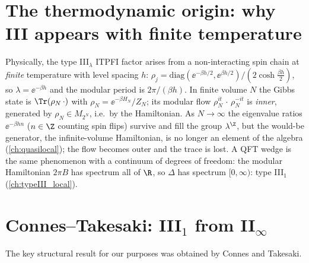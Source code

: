 \section{The thermodynamic origin: why III appears with finite temperature}

Physically, the type III$_\lambda$ ITPFI factor arises from a non-interacting spin chain at \emph{finite} temperature with level spacing $h$: $\rho_j=\mathrm{diag}(\ee^{-\beta h/2},\ee^{\beta h/2})/(2\cosh\tfrac{\beta h}2)$, so $\lambda=\ee^{-\beta h}$ and the modular period is $2\pi/(\beta h)$. In finite volume $N$ the Gibbs state is $\Tr(\rho_N\,\cdot)$ with $\rho_N=\ee^{-\beta H_N}/Z_N$; its modular flow $\rho_N^{it}\,\cdot\,\rho_N^{-it}$ is \emph{inner}, generated by $\rho_N\in M_{2^N}$, i.e.\ by the Hamiltonian. As $N\to\infty$ the eigenvalue ratios $\ee^{-\beta hn}$ ($n\in\Z$ counting spin flips) survive and fill the group $\lambda^\Z$, but the would-be generator, the infinite-volume Hamiltonian, is no longer an element of the algebra (\cref{ch:quasilocal}); the flow becomes outer and the trace is lost. A QFT wedge is the same phenomenon with a continuum of degrees of freedom: the modular Hamiltonian $2\pi B$ has spectrum all of $\R$, so $\Delta$ has spectrum $[0,\infty)$: type III$_1$ (\cref{ch:typeIII_local}).

\section{Connes--Takesaki: III$_1$ from II$_\infty$}

The key structural result for our purposes was obtained by Connes and Takesaki.

